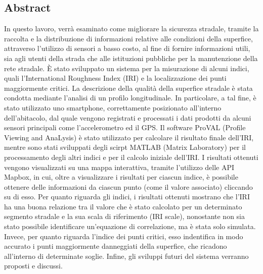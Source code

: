 \documentclass[tesi]{subfiles}
\begin{document}
\begin{flushright}
\section*{Abstract}\label{Abstract_IT}
\vspace{10mm}
\end{flushright}
In questo lavoro, verrà esaminato come migliorare la sicurezza stradale, tramite la raccolta e la distribuzione di informazioni relative alle condizioni della superfice, attraverso l’utilizzo di sensori a basso costo, al fine di fornire informazioni utili, sia agli utenti della strada che alle istituzioni pubbliche per la manutenzione della rete stradale. È stato sviluppato un sistema per la misurazione di alcuni indici, quali l’International Roughness Index (IRI) e la localizzazione dei punti maggiormente critici. La descrizione della qualità della superfice stradale è stata condotta mediante l’analisi di un profilo longitudinale. In particolare, a tal fine, è stato utilizzato uno smartphone, correttamente posizionato all’interno dell’abitacolo, dal quale vengono registrati e processati i dati prodotti da alcuni sensori principali come l’accelerometro ed il GPS. Il software ProVAL (Profile Viewing and AnaLysis) è stato utilizzato per calcolare il risultato finale dell’IRI, mentre sono stati sviluppati degli scirpt MATLAB (Matrix Laboratory) 
per il processamento degli altri indici e per il calcolo iniziale dell’IRI. I risultati ottenuti vengono visualizzati su una mappa interattiva, tramite l’utilizzo delle API Mapbox, in cui, oltre a visualizzare i risultati per ciascun indice, è possibile ottenere delle informazioni da ciascun punto (come il valore associato) cliccando su di esso.  Per quanto riguarda gli indici, i risultati ottenuti mostrano che l’IRI ha una buona relazione tra il valore che è stato calcolato per un determinato segmento stradale e la sua scala di riferimento (IRI scale), nonostante non sia stato possibile identificare un’equazione di correlazione, ma è stata solo simulata. Invece, per quanto riguarda l’indice dei punti critici, esso indentifica in modo accurato i punti maggiormente danneggiati della superfice, che ricadono all’interno di determinate soglie. Infine, gli sviluppi futuri del sistema verranno proposti e discussi.
\clearpage
\end{document}
